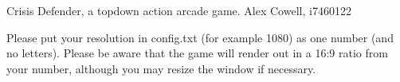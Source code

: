 Crisis Defender, a topdown action arcade game. Alex Cowell, i7460122

Please put your resolution in config.\-txt (for example 1080) as one number (and no letters). Please be aware that the game will render out in a 16\-:9 ratio from your number, although you may resize the window if necessary. 